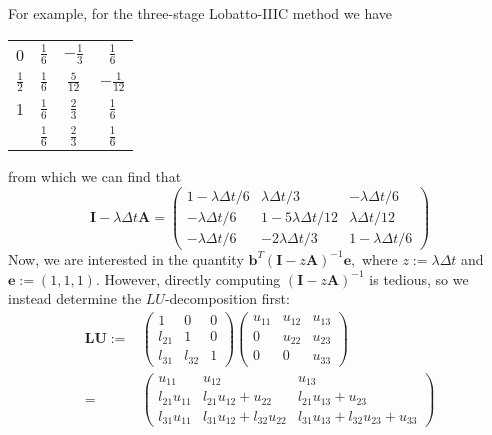 \documentclass[10pt,a4paper]{article}
\newcommand{\half}[0]{\frac{1}{2}}
\newcommand{\bvec}[1]{\mathbf{#1}}
\begin{document}
For example, for the three-stage Lobatto-IIIC method we have
\begin{table}[h]
  \centering
  \begin{tabular}{c|ccc}
    0 & $\frac{1}{6}$ & $-\frac{1}{3}$ & $\frac{1}{6}$ \\
    $\half$ & $\frac{1}{6}$ & $\frac{5}{12}$ & $-\frac{1}{12}$ \\
    1 & $\frac{1}{6}$ & $\frac{2}{3}$ & $\frac{1}{6}$ \\
\hline
    {} & $\frac{1}{6}$ & $\frac{2}{3}$ & $\frac{1}{6}$ \\
  \end{tabular}
\end{table}
from which we can find that
\begin{equation*}
  \bvec{I} - \lambda \Delta t \bvec{A} =
  \begin{pmatrix}
    1 - \lambda \Delta t/6 & \lambda \Delta t/3 & -\lambda \Delta t/6 \\
    -\lambda \Delta t/6 & 1 - 5\lambda \Delta t/12 & \lambda \Delta t/12 \\
    -\lambda \Delta t/6 & -2\lambda \Delta t/3 & 1 - \lambda \Delta t/6
  \end{pmatrix}
\end{equation*}
Now, we are interested in the quantity $\bvec{b}^T(\bvec{I}-z\bvec{A})^{-1}\bvec{e},$ where $z:=\lambda\Delta t$ and $\bvec{e} := (1, 1, 1).$
However, directly computing $(\bvec{I}-z\bvec{A})^{-1}$ is tedious, so we instead determine the $LU$-decomposition first:\\
\begin{align*}
  \bvec{LU} :=&
  \begin{pmatrix}
    1 & 0 & 0 \\
    l_{21} & 1 & 0 \\
    l_{31} & l_{32} & 1
  \end{pmatrix}
  \begin{pmatrix}
    u_{11} & u_{12} & u_{13} \\
    0 & u_{22} & u_{23} \\
    0 & 0 & u_{33}
  \end{pmatrix} \\
  =&\begin{pmatrix}
    u_{11} & u_{12} & u_{13} \\
    l_{21}u_{11} & l_{21}u_{12} + u_{22} & l_{21}u_{13} + u_{23} \\
    l_{31}u_{11} & l_{31}u_{12} + l_{32}u_{22} & l_{31}u_{13} + l_{32}u_{23} + u_{33}
  \end{pmatrix}
\end{align*}
\end{document}
